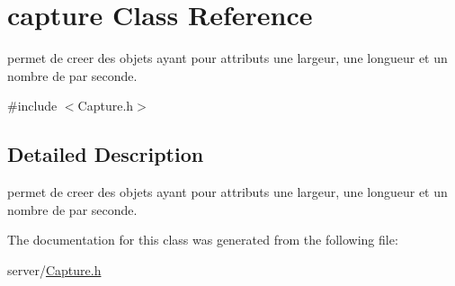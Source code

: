 \hypertarget{classcapture}{}\section{capture Class Reference}
\label{classcapture}


permet de creer des objets ayant pour attributs une largeur, une longueur et un nombre de  par seconde.  




{\ttfamily \#include $<$Capture.\+h$>$}



\subsection{Detailed Description}
permet de creer des objets ayant pour attributs une largeur, une longueur et un nombre de  par seconde. 

The documentation for this class was generated from the following file\+:\begin{DoxyCompactItemize}
\item 
server/\hyperlink{Capture_8h}{Capture.\+h}\end{DoxyCompactItemize}
